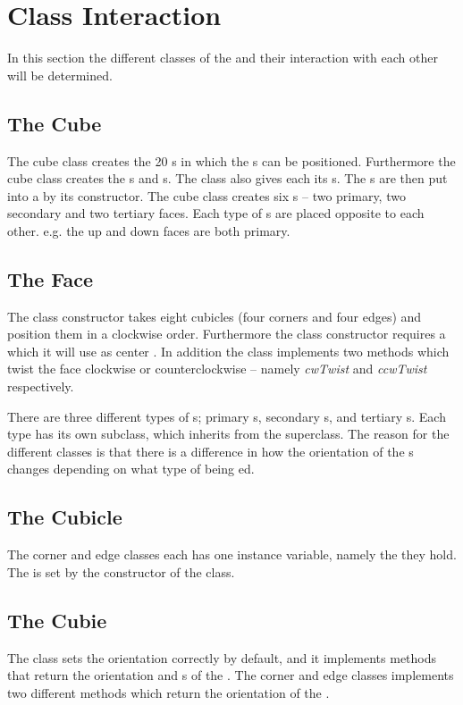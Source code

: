 \section{Class Interaction}
In this section the different classes of the \rubik{} and their interaction with each other will be determined.
\subsection{The Cube}
The cube class creates the 20 \cubicle{}s in which the \cpiece{}s can be positioned. Furthermore the cube class creates the \face{}s and \cubie{}s. The class also gives each \cpiece{} its \facelet{}s. The \cubicle{}s are then put into a \face{} by its constructor. The cube class creates six \face{}s -- two primary, two secondary and two tertiary faces. Each type of \face{}s are placed opposite to each other. e.g. the up and down faces are both primary.

\subsection{The Face}
The \face{} class constructor takes eight cubicles (four corners and four edges) and position them in a clockwise order. Furthermore the \face{} class constructor requires a \facelet{} which it will use as center \facelet{}. In addition the \face{} class implements two methods which twist the face clockwise or counterclockwise -- namely \textit{cwTwist} and \textit{ccwTwist} respectively.

There are three different types of \face{}s; primary \face{}s, secondary \face{}s, and tertiary \face{}s.
Each type has its own subclass, which inherits from the \face{} superclass.
The reason for the different classes is that there is a difference in how the orientation of the \cubie{}s changes depending on what type of \face{} being \twist{}ed.

\subsection{The Cubicle}
The corner and edge \cubicle{} classes each has one instance variable, namely the \cubie{} they hold. The \cpiece{} is set by the constructor of the \cubicle{} class.

\subsection{The Cubie}
The \cpiece{} class sets the orientation correctly by default, and it implements methods that return the orientation and \facelet{}s of the \cpiece{}. The corner and edge \cpiece{} classes implements two different methods which return the orientation of the \cpiece{}.

